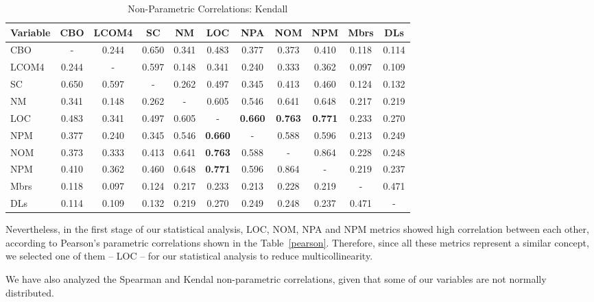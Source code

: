 \documentclass[conference]{IEEEtran}
\newcommand{\TODO}[1]{{\color{red}\textbf{\uwave{#1}}}}
\begin{document}
\begin{center}
\begin{table*}[bt]
\centering \caption{Non-Parametric Correlations: Kendall}
\begin{tabular}{|l|c|c|c|c|c|c|c|c|c|c|} \hline

\textbf{Variable} & CBO & LCOM4 & SC & NM & LOC & NPA & NOM & NPM & Mbrs & DLs
\\ \hline
CBO & - & 0.244 & 0.650 & 0.341 & 0.483 & 0.377 & 0.373 & 0.410 & 0.118 & 0.114
\\ \hline
LCOM4 & 0.244 & - & 0.597 & 0.148 & 0.341 & 0.240 & 0.333 & 0.362 & 0.097 & 0.109
\\ \hline
SC & 0.650 & 0.597 & - & 0.262 & 0.497 & 0.345 & 0.413 & 0.460 & 0.124 & 0.132
\\ \hline
NM & 0.341 & 0.148 & 0.262 & - & 0.605 & 0.546 & 0.641 & 0.648 & 0.217 & 0.219
\\ \hline
LOC & 0.483 & 0.341 & 0.497 & 0.605 & - & \textbf{0.660} & \textbf{0.763} & \textbf{0.771} & 0.233 & 0.270
\\ \hline
NPM & 0.377 & 0.240 & 0.345 & 0.546 & \textbf{0.660} & - & 0.588 & 0.596 & 0.213 & 0.249
\\ \hline
NOM & 0.373 & 0.333 & 0.413 & 0.641 & \textbf{0.763} & 0.588 & - & 0.864 & 0.228 & 0.248
\\ \hline
NPM & 0.410 & 0.362 & 0.460 & 0.648 & \textbf{0.771} & 0.596 & 0.864 & - & 0.219 & 0.237
\\ \hline
Mbrs & 0.118 & 0.097 & 0.124 & 0.217 & 0.233 & 0.213 & 0.228 & 0.219 & - & 0.471
\\ \hline
DLs & 0.114 & 0.109 & 0.132 & 0.219 & 0.270 & 0.249 & 0.248 & 0.237 & 0.471 & -
\\ \hline
\end{tabular}
\label{kendall}
\end{table*}
\end{center}

Nevertheless, in the first stage of our statistical analysis, LOC, NOM, NPA and NPM metrics 
showed high correlation between each other, according to Pearson's
parametric correlations shown in the Table~\ref{pearson}.
%
Therefore, since all these metrics represent a similar concept, we selected one of them -- LOC -- 
for our statistical analysis to reduce multicollinearity.

We have also analyzed the Spearman and Kendal non-parametric correlations, given that
some of our variables are not normally distributed. 
\end{document}
